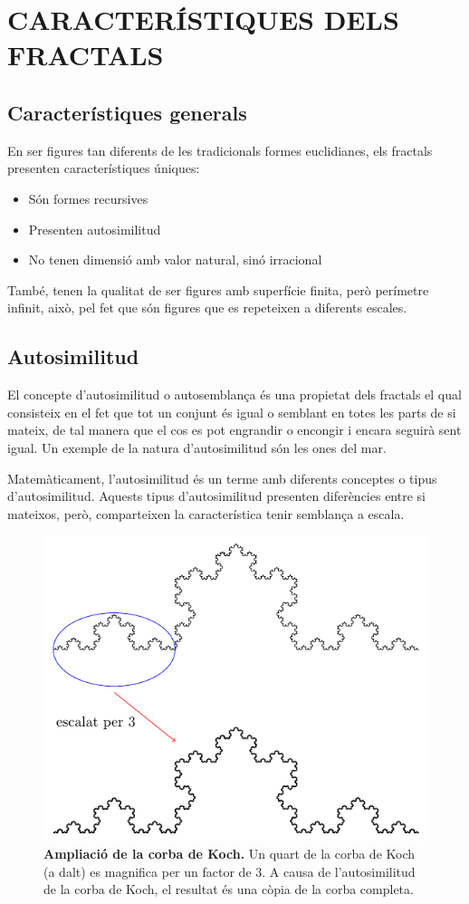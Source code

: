 \documentclass[12pt,a4paper]{report}
\begin{document}
\chapter{CARACTERÍSTIQUES DELS FRACTALS}
\section{Característiques generals}
En ser figures tan diferents de les tradicionals formes euclidianes, els fractals presenten característiques úniques:
\begin{itemize}
\item Són formes recursives
\item Presenten autosimilitud
\item No tenen dimensió amb valor natural, sinó irracional
\end{itemize}
També, tenen la qualitat de ser figures amb superfície finita, però perímetre infinit, això, pel fet que són figures que es repeteixen a diferents escales.
\section{Autosimilitud}
El concepte d'autosimilitud o autosemblança és una propietat dels fractals el qual consisteix en el fet que tot un conjunt és igual o semblant en totes les parts de si mateix, de tal manera que el cos es pot engrandir o encongir i encara seguirà sent igual. Un exemple de la natura d’autosimilitud són les ones del mar. 

Matemàticament, l’autosimilitud és un terme amb diferents conceptes o tipus d’autosimilitud. Aquests tipus d’autosimilitud presenten diferències entre si mateixos, però, comparteixen la característica tenir semblança a escala.
\begin{figure}[!ht]
\centering
\includegraphics[scale=1]{img/img02_01_kock.pdf}
\caption{\textbf{Ampliació de la corba de Koch.} Un quart de la corba de Koch (a dalt) es magnifica per un factor de 3. A causa de l'autosimilitud de la corba de Koch, el resultat és una còpia de la corba completa.}
\end{figure}
\end{document}

